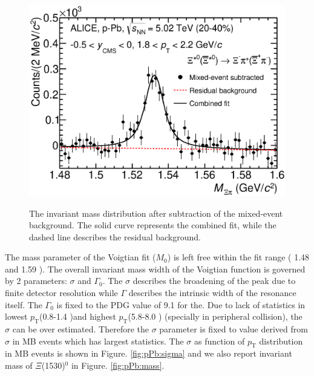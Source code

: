 \begin{figure}[htbp]
\begin{center}
\includegraphics[width=12.0cm]{./Version1/FigChapter5/Extraction/SigpPb_After.eps}
\hspace{0.5cm}
\label{fig:sigpPba} 
\caption{ The invariant mass distribution after subtraction of the mixed-event background. 
The solid curve represents the combined fit, while the dashed line describes the residual background.}
\end{center}
\end{figure}

The mass parameter of the Voigtian fit ($M_{0}$) is left free within the fit range ( 1.48 \Gmass and 1.59 \Gmass). The overall invariant mass width of the Voigtian function is governed by 2 parameters: $\sigma$ and $\Gamma_{0}$. The $\sigma$ describes the broadening of the peak due to finite detector resolution while $\Gamma$ describes the intrinsic width of the resonance itself. The $\Gamma_{0}$ is fixed to the PDG value of 9.1 \mmom for the\xis. Due to lack of statistics in lowest $p_{\mathrm{T}}$(0.8-1.4 \gmom )and highest $p_{\mathrm{T}}$(5.8-8.0 \gmom) (specially in peripheral collision), the $\sigma$ can be over estimated. Therefore the $\sigma$ parameter is fixed to value derived from $\sigma$ in MB events which has largest statistics. The $\sigma$ as function of $p_{\mathrm{T}}$ distribution in MB events is shown in Figure. \ref{fig:pPb:sigma} and we also report invariant mass of $\Xi$(1530)$^{0}$ in Figure. \ref{fig:pPb:mass}.

